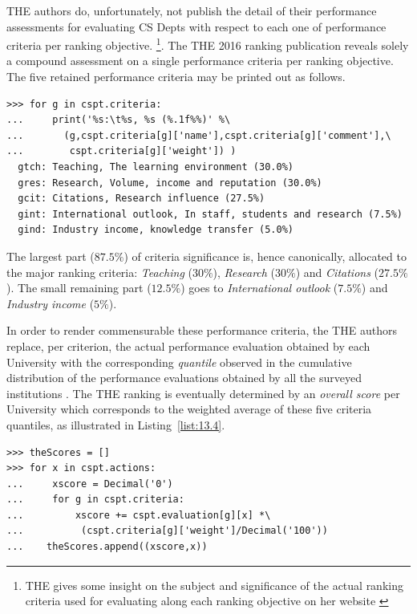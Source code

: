 THE authors do, unfortunately, not publish the detail of their performance assessments for evaluating CS Depts with respect to each one of performance criteria per ranking objective.  \footnote{THE gives some insight on the subject and significance of the actual ranking criteria used for evaluating along each ranking objective on her website \citep{THE-2016}}. The THE 2016 ranking publication reveals solely a compound assessment on a single performance criteria per ranking objective. The five retained performance criteria may be printed out as follows.
\begin{lstlisting}
>>> for g in cspt.criteria:
...     print('%s:\t%s, %s (%.1f%%)' %\
...       (g,cspt.criteria[g]['name'],cspt.criteria[g]['comment'],\
...        cspt.criteria[g]['weight']) )  
  gtch:	Teaching, The learning environment (30.0%)
  gres:	Research, Volume, income and reputation (30.0%)
  gcit:	Citations, Research influence (27.5%)
  gint:	International outlook, In staff, students and research (7.5%)
  gind:	Industry income, knowledge transfer (5.0%)
\end{lstlisting}

The largest part ($87.5\%$) of criteria significance is, hence canonically, allocated to the major ranking criteria: \emph{Teaching} ($30\%$), \emph{Research} ($30\%$) and \emph{Citations} ($27.5\%$). The small remaining part ($12.5\%$) goes to \emph{International outlook} ($7.5\%$) and \emph{Industry income} ($5\%$).

In order to render commensurable these performance criteria, the THE authors replace, per criterion, the actual performance evaluation obtained by each University with the corresponding \emph{quantile} observed in the cumulative distribution of the performance evaluations obtained by all the surveyed institutions \citep{THE-2016}. The THE ranking is eventually determined by an \emph{overall score} per University which corresponds to the weighted average of these five criteria quantiles, as illustrated in Listing~\vref{list:13.4}.     
\begin{lstlisting}[caption={Computing the THE overall scores},label=list:13.4]
>>> theScores = []
>>> for x in cspt.actions:
...     xscore = Decimal('0')
...     for g in cspt.criteria:
...         xscore += cspt.evaluation[g][x] *\
...          (cspt.criteria[g]['weight']/Decimal('100'))
...	   theScores.append((xscore,x))
\end{lstlisting}

